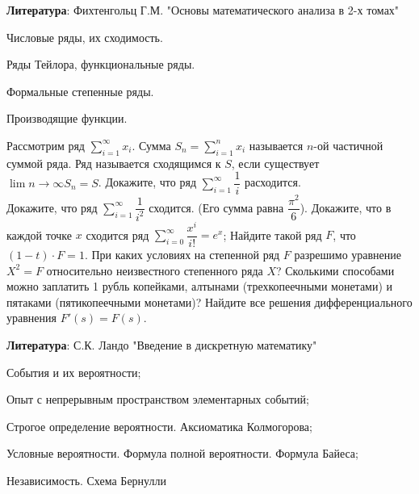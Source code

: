\documentclass[a4paper,12pt]{article}
\begin{document}
{\bf Литература}: Фихтенгольц Г.М. "Основы математического анализа в 2-х томах"





\newpage
{}

\begin{nums}{-2}
\item Числовые ряды, их сходимость.
\item Ряды Тейлора, функциональные ряды.
\item Формальные степенные ряды.
\item Производящие функции.
\end{nums}

Рассмотрим ряд $\sum\limits_{i=1}^{\infty} x_i$. Сумма $S_n=\sum\limits_{i=1}^{n} x_i$ называется $n$-ой частичной суммой ряда. Ряд называется сходящимся к $S$, если существует $\lim\limits{n\to\infty} S_n = S$.
Докажите, что ряд $\sum\limits_{i=1}^{\infty} \dfrac{1}{i}$ расходится.\\
Докажите, что ряд $\sum\limits_{i=1}^{\infty}\dfrac{1}{i^2}$ сходится. (Его сумма равна $\dfrac{\pi^2}{6}$).
Докажите, что в каждой точке $x$ сходится ряд $\sum\limits_{i=0}^{\infty} \dfrac{x^i}{i!} = e^x$;
Найдите такой ряд $F$, что $(1-t)\cdot F = 1$.
При каких условиях на степенной ряд $F$ разрешимо уравнение $X^2 = F$ относительно неизвестного степенного ряда $X$?
Сколькими способами можно заплатить 1 рубль копейками, алтынами (трехкопеечными монетами) и пятаками (пятикопеечными монетами)?
Найдите все решения дифференциального уравнения $F'(s)=F(s)$.

{\bf Литература}: С.К. Ландо "Введение в дискретную математику"













\newpage
{}

\begin{nums}{-2}
\item События и их вероятности;
\item  Опыт с непрерывным пространством элементарных событий;
\item Строгое определение вероятности. Аксиоматика Колмогорова;
\item Условные вероятности. Формула полной вероятности. Формула Байеса;
\item Независимость. Схема Бернулли
\end{nums}
\end{document}
